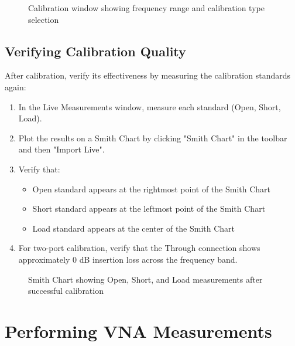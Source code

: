 \documentclass[12pt,a4paper]{article}
\begin{document}
\begin{figure}[H]
    \centering
    \caption{Calibration window showing frequency range and calibration type selection}
    \label{fig:cal_window}
\end{figure}

\subsection{Verifying Calibration Quality}

After calibration, verify its effectiveness by measuring the calibration standards again:

\begin{enumerate}
    \item In the Live Measurements window, measure each standard (Open, Short, Load).
    \item Plot the results on a Smith Chart by clicking "Smith Chart" in the toolbar and then "Import Live".
    \item Verify that:
    \begin{itemize}
        \item Open standard appears at the rightmost point of the Smith Chart
        \item Short standard appears at the leftmost point of the Smith Chart
        \item Load standard appears at the center of the Smith Chart
    \end{itemize}
    \item For two-port calibration, verify that the Through connection shows approximately 0 dB insertion loss across the frequency band.
\end{enumerate}

\begin{figure}[H]
    \centering
    \caption{Smith Chart showing Open, Short, and Load measurements after successful calibration}
    \label{fig:cal_verify}
\end{figure}

\section{Performing VNA Measurements}
\end{document}
